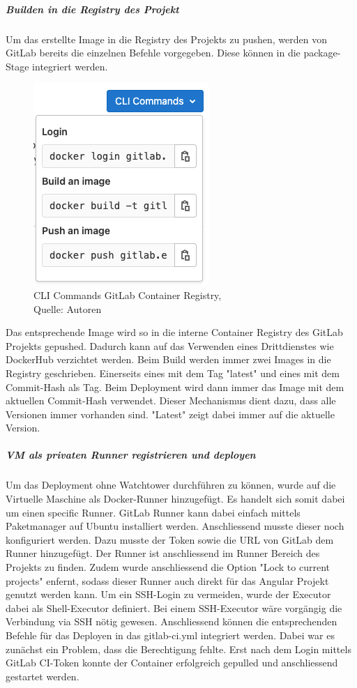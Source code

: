 \subparagraph{Builden in die Registry des Projekt}
Um das erstellte Image in die Registry des Projekts zu pushen, werden von GitLab bereits die einzelnen Befehle vorgegeben. Diese können in die package-Stage integriert werden. 
\begin{figure}[H]
	\centering
	\includegraphics[scale=0.5]{images/gitLabRegistry.png}
	\caption[CLI Commands GitLab Container Registry]{CLI Commands GitLab Container Registry,\\ Quelle: Autoren}
\label{img: containerRegistryGitlab}
\end{figure}

Das entsprechende Image wird so in die interne Container Registry des GitLab Projekts gepushed. Dadurch kann auf das Verwenden eines Drittdienstes wie DockerHub verzichtet werden. 
Beim Build werden immer zwei Images in die Registry geschrieben. Einerseits eines mit dem Tag "latest" und eines mit dem Commit-Hash als Tag. Beim Deployment wird dann immer das Image mit dem aktuellen Commit-Hash verwendet. Dieser Mechanismus dient dazu, dass alle Versionen immer vorhanden sind. "Latest" zeigt dabei immer auf die aktuelle Version. 

\subparagraph{VM als privaten Runner registrieren und deployen}
Um das Deployment ohne Watchtower durchführen zu können, wurde auf die Virtuelle Maschine als Docker-Runner hinzugefügt. Es handelt sich somit dabei um einen specific Runner. 
GitLab Runner kann dabei einfach mittels Paketmanager auf Ubuntu installiert werden. Anschliessend musste dieser noch konfiguriert werden. Dazu musste der Token sowie die URL von GitLab dem Runner hinzugefügt. Der Runner ist anschliessend im Runner Bereich des Projekts zu finden. Zudem wurde anschliessend die Option "Lock to current projects" enfernt, sodass dieser Runner auch direkt für das Angular Projekt genutzt werden kann. 
Um ein SSH-Login zu vermeiden, wurde der Executor dabei als Shell-Executor definiert. Bei einem SSH-Executor wäre vorgängig die Verbindung via SSH nötig gewesen. 
Anschliessend können die entsprechenden Befehle für das Deployen in das gitlab-ci.yml integriert werden. Dabei war es zunächst ein Problem, dass die Berechtigung fehlte. Erst nach dem Login mittels GitLab CI-Token konnte der Container erfolgreich gepulled und anschliessend gestartet werden. 

